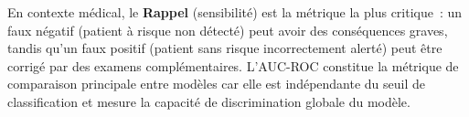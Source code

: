 En contexte médical, le \textbf{Rappel} (sensibilité) est la métrique la plus critique~: un faux négatif (patient à risque non détecté) peut avoir des conséquences graves, tandis qu'un faux positif (patient sans risque incorrectement alerté) peut être corrigé par des examens complémentaires. L'AUC-ROC constitue la métrique de comparaison principale entre modèles car elle est indépendante du seuil de classification et mesure la capacité de discrimination globale du modèle.

